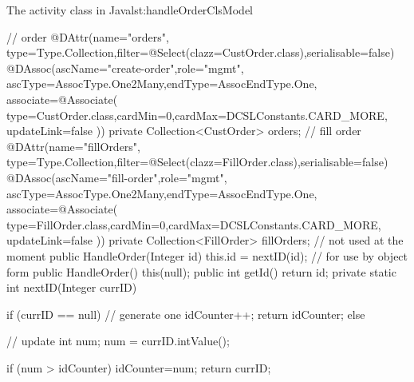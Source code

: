 \begin{lstcodeplainssm}{The activity class  in Java}{lst:handleOrderClsModel}
{	// order 
	@DAttr(name="orders", type=Type.Collection,filter=@Select(clazz=CustOrder.class),serialisable=false)
	@DAssoc(ascName="create-order",role="mgmt",
	ascType=AssocType.One2Many,endType=AssocEndType.One,
	associate=@Associate(
	type=CustOrder.class,cardMin=0,cardMax=DCSLConstants.CARD_MORE,
	updateLink=false
	))
	private Collection<CustOrder> orders;
	// fill order
	@DAttr(name="fillOrders", type=Type.Collection,filter=@Select(clazz=FillOrder.class),serialisable=false)
	@DAssoc(ascName="fill-order",role="mgmt",
	ascType=AssocType.One2Many,endType=AssocEndType.One,
	associate=@Associate(
	type=FillOrder.class,cardMin=0,cardMax=DCSLConstants.CARD_MORE,
	updateLink=false
	))
	private Collection<FillOrder> fillOrders;
	// not used at the moment
	public HandleOrder(Integer id) {
		this.id = nextID(id);
	}	
	// for use by object form
	public HandleOrder() {
		this(null);
	}	
	public int getId() {
		return id;
	}	
	private static int nextID(Integer currID) {
		if (currID == null) { // generate one
			idCounter++;
			return idCounter;
		} else { // update
			int num;
			num = currID.intValue();
			
			if (num > idCounter) {
				idCounter=num;
			}   
			return currID;
		}
	}
}
\end{lstcodeplainssm}
